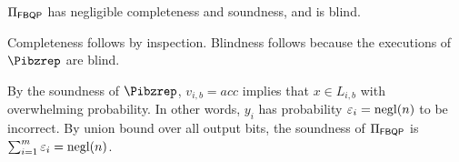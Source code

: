 \begin{theorem}
	$\Pi_{\operatorname{\mathsf{FBQP}}}$ has negligible completeness and soundness, and is blind.
\end{theorem}
\begin{prf}
	Completeness follows by inspection.
	Blindness follows because the executions of $\Pibzrep$ are blind.

	By the soundness of $\Pibzrep$, $v_{i, b}=acc$ implies that $x\in L_{i, b}$ with overwhelming probability.
	In other words, $y_i$ has probability $\varepsilon_i=\operatorname{negl}(n)$ to be incorrect.
	By union bound over all output bits, the soundness of $\Pi_{\operatorname{\mathsf{FBQP}}}$ is
	$\sum_{i=1}^m \varepsilon_i=\operatorname{negl}(n)$.
\end{prf}
